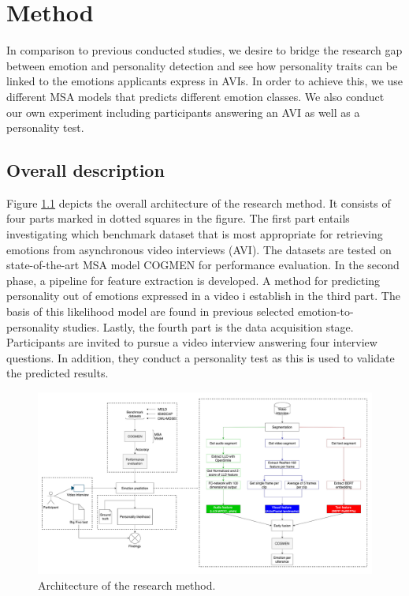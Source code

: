 \chapter{Method}
In comparison to previous conducted studies, we desire to bridge the research gap between emotion and personality detection and see how personality traits can be linked to the emotions applicants express in AVIs. In order to achieve this, we use different MSA models that predicts different emotion classes. We also conduct our own experiment including participants answering an AVI as well as a personality test. 

\section{Overall description}
Figure \ref{fig:research_method} depicts the overall architecture of the research method. It consists of four parts marked in dotted squares in the figure. The first part entails investigating which benchmark dataset that is most appropriate for retrieving emotions from asynchronous video interviews (AVI). The datasets are tested on state-of-the-art MSA model COGMEN for performance evaluation. In the second phase, a pipeline for feature extraction is developed. A method for predicting personality out of emotions expressed in a video i establish in the third part. The basis of this likelihood model are found in previous selected emotion-to-personality studies. Lastly, the fourth part is the data acquisition stage. Participants are invited to pursue a video interview answering four interview questions. In addition, they conduct a personality test as this is used to validate the predicted results.  
%
\begin{figure}[h]
  \centering
  \includegraphics[width=\textwidth]{figures/research_method_dpi.png}
  \caption{Architecture of the research method.}
  \label{fig:research_method}
\end{figure}
%
